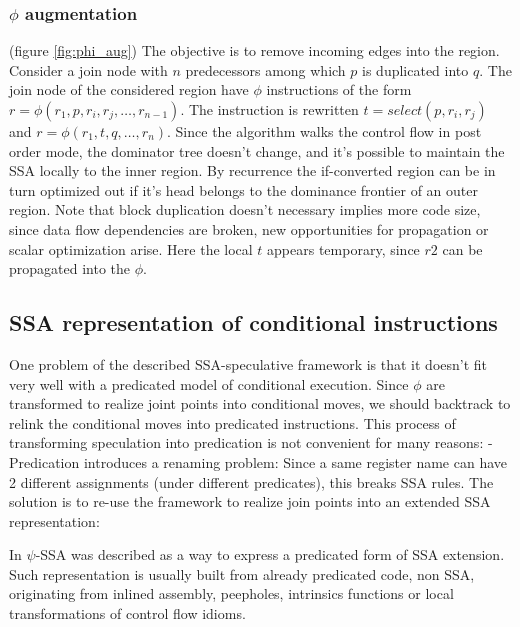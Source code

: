 \subsubsection{$\phi$ augmentation} (figure \ref{fig:phi_aug})
The objective is to remove incoming edges into the region. 
Consider a join node with $n$ predecessors among which $p$ is duplicated into $q$.  The join node of the considered region have $\phi$ instructions of the form $r=\phi(r_1,p,r_i,r_j,\dots,r_{n-1})$. The instruction is rewritten $t=select(p,r_i,r_j)$ and \mbox{$r=\phi(r_1,t,q,\dots,r_n)$}. 
Since the algorithm walks the control flow in post order mode, the dominator tree doesn't change, and it's possible to maintain the SSA locally to the inner region. By recurrence the if-converted region can be in turn optimized out if it's head belongs to the dominance frontier of an outer region.
Note that block duplication doesn't necessary implies more code size, since data flow dependencies are broken, new opportunities for propagation or scalar optimization arise. Here the local $t$ appears temporary, since $r2$ can be propagated into the $\phi$.

\subsection{SSA representation of conditional instructions}

One problem of the described SSA-speculative framework is that it doesn't fit very well with a predicated model of conditional execution. Since $\phi$ are transformed to realize joint points into conditional moves, we should backtrack to relink the conditional moves into predicated instructions. This process of transforming speculation into predication is not convenient for many reasons:
- Predication introduces a renaming problem: Since a same register name can have 2 different assignments (under different predicates), this breaks SSA rules. The solution is to re-use the framework to realize join points into an extended SSA representation:

In \cite{Stoutchinin:2001:ESS:563998.564022} $\psi$-SSA was described as a way to express a predicated form of SSA extension. Such representation is usually built from already predicated code, non SSA, originating from inlined assembly, peepholes, intrinsics functions or local transformations of control flow idioms. 

